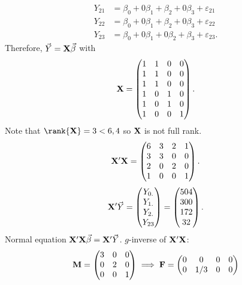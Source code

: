 \begin{Example}{}{}
\begin{align*}
        Y_{21} & =\beta_0+0\beta_1+\beta_2+0\beta_3+\varepsilon_{21}  \\
        Y_{22} & =\beta_0+0\beta_1+\beta_2+0\beta_3+\varepsilon_{22}  \\
        Y_{23} & =\beta_0+0\beta_1+0\beta_2+\beta_3+\varepsilon_{23}.
    \end{align*}
    Therefore, $ \vec{Y}=\mathbf{X}\vec{\beta} $ with
    \[ \mathbf{X}=\begin{pmatrix}
            1 & 1 & 0 & 0 \\
            1 & 1 & 0 & 0 \\
            1 & 1 & 0 & 0 \\
            1 & 0 & 1 & 0 \\
            1 & 0 & 1 & 0 \\
            1 & 0 & 0 & 1
        \end{pmatrix}. \]
    Note that $ \rank{\Matrix{X}}=3<\min{6,4} $ so $ \mathbf{X} $ is not full rank.
    \[ \mathbf{X}'\mathbf{X}=\begin{pmatrix}
            6 & 3 & 2 & 1 \\
            3 & 3 & 0 & 0 \\
            2 & 0 & 2 & 0 \\
            1 & 0 & 0 & 1
        \end{pmatrix}. \]
    \[ \mathbf{X}'\vec{Y}=\begin{pmatrix}
            Y_{0.} \\
            Y_{1.} \\
            Y_{2.} \\
            Y_{23}
        \end{pmatrix}=\begin{pmatrix}
            504 \\ 300 \\ 172 \\32
        \end{pmatrix}. \]
    Normal equation $ \mathbf{X}'\mathbf{X}\vec{\beta}=\mathbf{X}'\vec{Y} $.
    $ g $-inverse of $ \mathbf{X}'\mathbf{X} $:
    \[ \mathbf{M}=\begin{pmatrix}
            3 & 0 & 0 \\
            0 & 2 & 0 \\
            0 & 0 & 1
        \end{pmatrix}\implies
        \mathbf{F}=\begin{pmatrix}
            0 & 0   & 0   & 0 \\
            0 & 1/3 & 0   & 0 \\

\end{pmatrix}\]
\end{Example}
